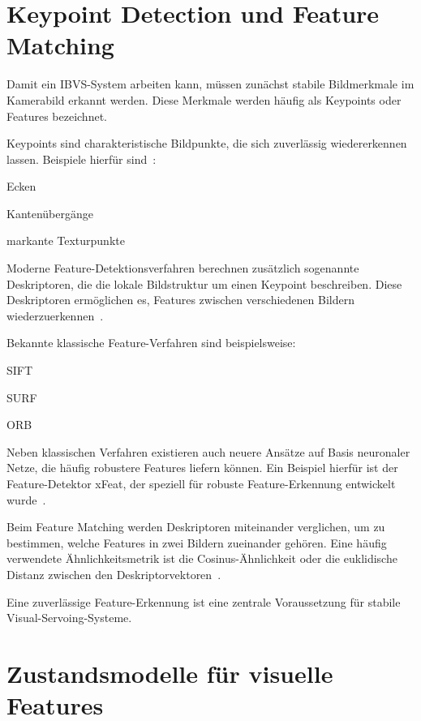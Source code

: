 \section{Keypoint Detection und Feature Matching}
\label{sec:KeypointDetectionundFeatureMatching}
Damit ein \ac{IBVS}-System arbeiten kann, müssen zunächst stabile Bildmerkmale im Kamerabild erkannt werden. Diese Merkmale werden häufig als Keypoints oder Features bezeichnet.

Keypoints sind charakteristische Bildpunkte, die sich zuverlässig wiedererkennen lassen. Beispiele hierfür sind~\cite{szeliski2022computer}:
\begin{listNorm}
	\item Ecken
	\item Kantenübergänge
	\item markante Texturpunkte
\end{listNorm}

Moderne Feature-Detektionsverfahren berechnen zusätzlich sogenannte Deskriptoren, die die lokale Bildstruktur um einen Keypoint beschreiben. Diese Deskriptoren ermöglichen es, Features zwischen verschiedenen Bildern wiederzuerkennen~\cite{szeliski2022computer}.

Bekannte klassische Feature-Verfahren sind beispielsweise:
\begin{listNorm}
	\item \ac{SIFT}
	\item \ac{SURF}
	\item \ac{ORB}
\end{listNorm}

Neben klassischen Verfahren existieren auch neuere Ansätze auf Basis neuronaler Netze, die häufig robustere Features liefern können. Ein Beispiel hierfür ist der Feature-Detektor xFeat, der speziell für robuste Feature-Erkennung entwickelt wurde~\cite{potje2024xfeat}.

Beim Feature Matching werden Deskriptoren miteinander verglichen, um zu bestimmen, welche Features in zwei Bildern zueinander gehören. Eine häufig verwendete Ähnlichkeitsmetrik ist die Cosinus-Ähnlichkeit oder die euklidische Distanz zwischen den Deskriptorvektoren~\cite{szeliski2022computer}.

Eine zuverlässige Feature-Erkennung ist eine zentrale Voraussetzung für stabile Visual-Servoing-Systeme.

\newpage
\section{Zustandsmodelle für visuelle Features}
\label{sec:ZustandsmodellefürvisuelleFeatures}

